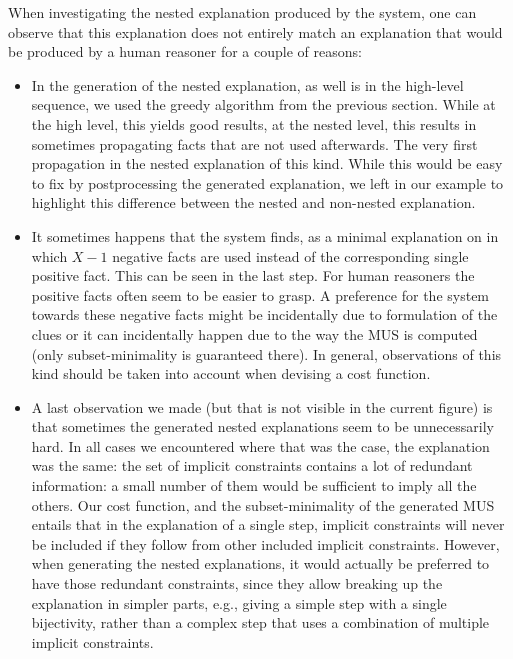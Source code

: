 When investigating the nested explanation produced by the system, one can observe that this explanation does not entirely match an explanation that would be produced by a human reasoner for a couple of reasons: 
\begin{itemize}
 \item In the generation of the nested explanation, as well is in the high-level sequence, we used the greedy algorithm from the previous section. While at the high level, this yields good results, at the nested level, this results in sometimes propagating facts that are not used afterwards. The very first propagation in the nested explanation of this kind. While this would be easy to fix by postprocessing the generated explanation, we left in our example to highlight this difference between the nested and non-nested explanation. 
 \item It sometimes happens that the system finds, as a minimal explanation on in which $X-1$ negative facts are used instead of the corresponding single positive fact. This can be seen in the last step. For human reasoners the positive facts often seem to be easier to grasp. A preference for the system towards these negative facts might be incidentally due to formulation of the clues or it can incidentally happen due to the way the MUS is computed (only subset-minimality is guaranteed there). 
 In general, observations of this kind should be taken into account when devising a cost function. 
 \item A last observation we made (but that is not visible in the current figure) is that sometimes the generated nested explanations seem to be unnecessarily hard. In all cases we encountered where that was the case, the explanation was the same: the set of implicit constraints contains a lot of redundant information: a small number of them would be sufficient to imply all the others. Our cost function, and the subset-minimality of the generated MUS entails that in the explanation of a single step, implicit constraints will never be included if they follow from other included implicit constraints. However, when generating the nested explanations, it would actually be preferred to have those redundant constraints, since they allow breaking up the explanation in simpler parts, e.g., giving a simple step with a single bijectivity, rather than a complex step that uses a combination of multiple implicit constraints.
\end{itemize}




